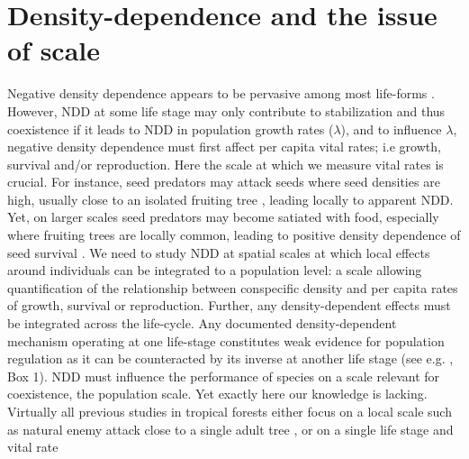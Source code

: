 \documentclass[b5paper,justified]{tufte-book} %
\begin{document}
\section{Density-dependence and the issue of scale}  
Negative density dependence appears to be pervasive among most life-forms \citep{Harms2000, Brook2006}.  However, NDD at some life stage may only contribute to stabilization and thus coexistence if it leads to NDD in population growth rates ($\lambda$), and to influence $\lambda$, negative density dependence must first affect per capita vital rates;  i.e growth, survival and/or reproduction.  Here the scale at which we measure vital rates is crucial.  For instance, seed predators may attack seeds where seed densities are high, usually close to an isolated fruiting tree \citep{Comita2014}, leading locally to apparent NDD.  Yet, on larger scales seed predators may become satiated with food, especially where fruiting trees are locally common, leading to positive density dependence of seed survival \citep[e.g.][]{Schupp1992}.  We need to study NDD at spatial scales at which local effects around individuals can be integrated to a population level: a scale allowing quantification of the relationship between conspecific density and per capita rates of growth, survival or reproduction. Further, any density-dependent effects must be integrated across the life-cycle. Any documented density-dependent mechanism operating at one life-stage constitutes weak evidence for population regulation as it can be counteracted by its inverse at another life stage  (see e.g. \citealt{Turchin1995}, Box 1).  NDD must influence the performance of species on a scale relevant for coexistence, the population scale.  Yet exactly here our knowledge is lacking.  Virtually all previous studies in tropical forests either focus on a local scale such as natural enemy attack close to a single adult tree \citep{Bagchi2010}, or on a single life stage and vital rate 
\end{document}
